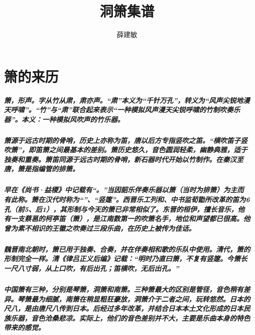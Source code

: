 \documentclass[cn,pad,chinesefont=nofont,twocol]{elegantbook}
\title{洞箫集谱}
\author{薛建敏}
\date{\zhtoday}
\begin{document}
\maketitle
\frontmatter
\tableofcontents
\mainmatter

\chapter{箫的来历}
\paragraph*{箫，形声。字从竹从肃，肃亦声。“肃”本义为“千针万孔”，转义为“风声尖锐地漫天呼啸”。“竹”与“肃”联合起来表示“一种模拟风声漫天尖锐呼啸的竹制吹奏乐器”。本义：一种模拟风吹声的竹乐器。}
\paragraph*{箫源于远古时期的骨哨，历史上亦称为笛，唐以后方专指竖吹之笛。“横吹笛子竖吹箫”，即笛箫之间最基本的差别。箫历史悠久，音色圆润轻柔，幽静典雅，适于独奏和重奏。箫笛同源于远古时期的骨哨，新石器时代开始以竹制作。在秦汉至唐，箫是指编管的排箫。} 
\paragraph*{早在《尚书·益稷》中记载有“。”当因韶乐伴奏乐器以箫（当时为排箫）为主而有此称。箫在汉代时称为“”、“竖篴”。西晋乐工列和、中书监荀勖所改革的笛为6 孔（前5、后1），其形制与今天的箫已非常相似了。东晋的桓伊，擅长音乐，他有一支蔡邕的柯亭笛（箫），是江南数第一的吹箫名手，地位和声望都已很高。他曾为素不相识的王徽之吹奏过三段乐曲，在历史上被传为佳话。}
\paragraph*{魏晋南北朝时，箫已用于独奏、合奏，并在伴奏相和歌的乐队中使用。清代，箫的形制完全一样。清《律吕正义后编》记载：“明时乃直曰箫，不复有竖篴。今箫长一尺八寸弱，从上口吹，有后出孔；笛横吹，无后出孔。”}
\paragraph*{中国箫有三种，分别是琴箫，洞箫和南箫。三种箫最大的区别是管径，音色稍有差异。琴箫最为细腻，南箫在稍显粗狂豪放，洞箫介于二者之间，玩转悠然。日本的尺八，是由唐尺八传到日本。后经过多年改革，并结合日本本土文化形成的日本民族乐器，音色沧桑悲凉。实际上，他们的音色差别并不大，主要是乐曲本身的特色带来的感觉。}
\end{document}
